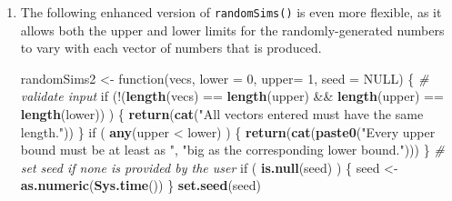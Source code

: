 \documentclass[]{book}
\makeatletter
\newenvironment{Shaded}{\begin{snugshade}}{\end{snugshade}}
\newcommand{\KeywordTok}[1]{\textcolor[rgb]{0.13,0.29,0.53}{\textbf{{#1}}}}
\newcommand{\DataTypeTok}[1]{\textcolor[rgb]{0.13,0.29,0.53}{{#1}}}
\newcommand{\DecValTok}[1]{\textcolor[rgb]{0.00,0.00,0.81}{{#1}}}
\newcommand{\StringTok}[1]{\textcolor[rgb]{0.31,0.60,0.02}{{#1}}}
\newcommand{\CommentTok}[1]{\textcolor[rgb]{0.56,0.35,0.01}{\textit{{#1}}}}
\newcommand{\OtherTok}[1]{\textcolor[rgb]{0.56,0.35,0.01}{{#1}}}
\newcommand{\NormalTok}[1]{{#1}}
\newenvironment{kframe}{%
\medskip{}
\setlength{\fboxsep}{.8em}
 \def\at@end@of@kframe{}%
 \ifinner\ifhmode%
  \def\at@end@of@kframe{\end{minipage}}%
  \begin{minipage}{\columnwidth}%
 \fi\fi%
 \def\FrameCommand##1{\hskip\@totalleftmargin \hskip-\fboxsep
 \colorbox{shadecolor}{##1}\hskip-\fboxsep
     \hskip-\linewidth \hskip-\@totalleftmargin \hskip\columnwidth}%
 \MakeFramed {\advance\hsize-\width
   \@totalleftmargin\z@ \linewidth\hsize
   \@setminipage}}%
 {\par\unskip\endMakeFramed%
 \at@end@of@kframe}
\renewenvironment{Shaded}{\begin{kframe}}{\end{kframe}}
\theoremstyle{definition}
\theoremstyle{definition}
\theoremstyle{remark}
\makeatother
\begin{document}
{\begin{enumerate}
\begin{Shaded}
\begin{Highlighting}[]
\NormalTok{randomSims <-}\StringTok{ }\NormalTok{function(vecs, }\DataTypeTok{lower =} \DecValTok{0}\NormalTok{, }\DataTypeTok{upper=} \DecValTok{1}\NormalTok{, }\DataTypeTok{seed =} \OtherTok{NULL}\NormalTok{) \{}
  \CommentTok{# set seed if none is provided by the user}
  \NormalTok{if ( }\KeywordTok{is.null}\NormalTok{(seed) ) \{}
    \NormalTok{seed <-}\StringTok{ }\KeywordTok{as.numeric}\NormalTok{(}\KeywordTok{Sys.time}\NormalTok{())}
  \NormalTok{\}}
  \KeywordTok{set.seed}\NormalTok{(seed)}

  \NormalTok{lst <-}\StringTok{ }\KeywordTok{vector}\NormalTok{(}\DataTypeTok{mode =} \StringTok{"list"}\NormalTok{, }\DataTypeTok{length =} \KeywordTok{length}\NormalTok{(vecs))}
  \NormalTok{for ( i in }\KeywordTok{seq_along}\NormalTok{(vecs) ) \{}
    \NormalTok{lst[[i]] <-}\StringTok{ }\KeywordTok{runif}\NormalTok{(vecs[i], }\DataTypeTok{min =} \NormalTok{lower, }\DataTypeTok{max =} \NormalTok{upper)}
  \NormalTok{\}}
  \NormalTok{lst}
\NormalTok{\}}
\end{Highlighting}
\end{Shaded}

  Refactor the code for \texttt{randomSims()} so that it uses
  \texttt{lapply()} instead of a loop.
\item
  The following enhanced version of \texttt{randomSims()} is even more
  flexible, as it allows both the upper and lower limits for the
  randomly-generated numbers to vary with each vector of numbers that is
  produced.

\begin{Shaded}
\begin{Highlighting}[]
\NormalTok{randomSims2 <-}\StringTok{ }\NormalTok{function(vecs, }\DataTypeTok{lower =} \DecValTok{0}\NormalTok{, }\DataTypeTok{upper=} \DecValTok{1}\NormalTok{, }\DataTypeTok{seed =} \OtherTok{NULL}\NormalTok{) \{}
  \CommentTok{# validate input}
  \NormalTok{if (!(}\KeywordTok{length}\NormalTok{(vecs) ==}\StringTok{ }\KeywordTok{length}\NormalTok{(upper) &&}\StringTok{ }\KeywordTok{length}\NormalTok{(upper) ==}\StringTok{ }\KeywordTok{length}\NormalTok{(lower)) ) \{}
    \KeywordTok{return}\NormalTok{(}\KeywordTok{cat}\NormalTok{(}\StringTok{"All vectors entered must have the same length."}\NormalTok{))}
  \NormalTok{\}}
  \NormalTok{if ( }\KeywordTok{any}\NormalTok{(upper <}\StringTok{ }\NormalTok{lower) ) \{}
    \KeywordTok{return}\NormalTok{(}\KeywordTok{cat}\NormalTok{(}\KeywordTok{paste0}\NormalTok{(}\StringTok{"Every upper bound must be at least as "}\NormalTok{,}
                      \StringTok{"big as the corresponding lower bound."}\NormalTok{)))}
  \NormalTok{\}}
  \CommentTok{# set seed if none is provided by the user}
  \NormalTok{if ( }\KeywordTok{is.null}\NormalTok{(seed) ) \{}
    \NormalTok{seed <-}\StringTok{ }\KeywordTok{as.numeric}\NormalTok{(}\KeywordTok{Sys.time}\NormalTok{())}
  \NormalTok{\}}
  \KeywordTok{set.seed}\NormalTok{(seed)}


\end{Highlighting}
\end{Shaded}
\end{enumerate}}
\end{document}
